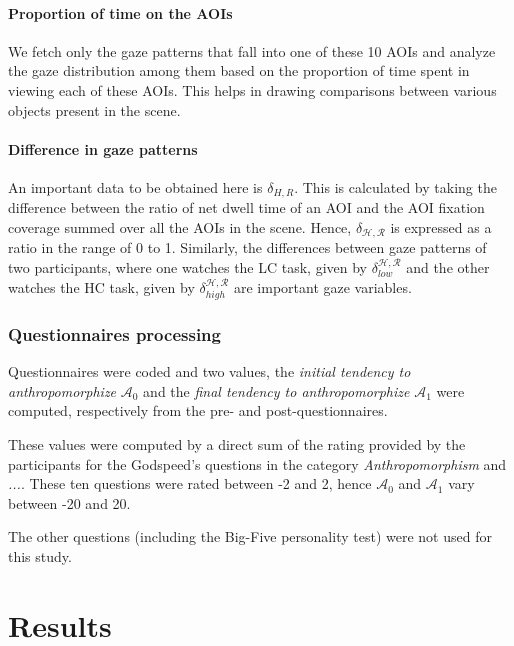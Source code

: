\documentclass[a4,twocolumn,10pt]{article}
\newcommand{\anti}{{$\mathcal{A}_0$ }}
\newcommand{\antf}{{$\mathcal{A}_1$ }}
\begin{document}
\paragraph{Proportion of time on the AOIs}

We fetch only the gaze patterns that fall into one of these 10 AOIs and analyze
the gaze distribution among them based on the proportion of time spent in
viewing each of these AOIs. This helps in drawing comparisons between various
objects present in the scene. 

\paragraph{Difference in gaze patterns}

An important data to be obtained here is $\delta_{H,R}$. This is calculated by
taking the difference between the ratio of net dwell time of an AOI and the AOI
fixation coverage summed over all the AOIs in the scene. Hence,
$\delta_{\mathcal{H},\mathcal{R}}$ is expressed as a ratio in the range of 0 to
1. Similarly, the differences between gaze patterns of two participants, where
one watches the LC task, given by $\delta_{low}^{\mathcal{H},\mathcal{R}}$ and
the other watches the HC task, given by
$\delta_{high}^{\mathcal{H},\mathcal{R}}$ are important gaze variables.

\subsubsection{Questionnaires processing}


Questionnaires were coded and two values, the \emph{initial tendency to
anthropomorphize} \anti and the \emph{final tendency to anthropomorphize} \antf
were computed, respectively from the pre- and post-questionnaires.

These values were computed by a direct sum of the rating provided by the
participants for the Godspeed's questions in the category
\emph{Anthropomorphism} and \emph{...}. These ten questions were
rated between -2 and 2, hence \anti and \antf vary between -20 and 20.

The other questions (including the Big-Five personality test) were not used for
this study.

\section{Results}
\end{document}
